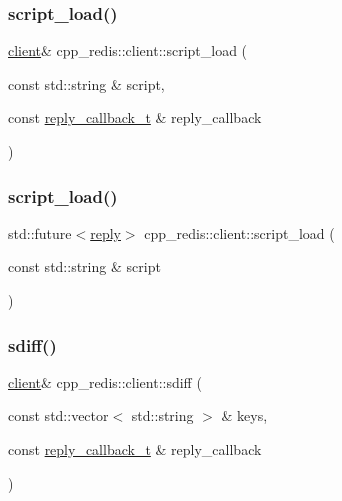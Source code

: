 \mbox{\label{classcpp__redis_1_1client_a1c1d1b3daff14dc29c32d1ea8407efdb}} 
\subsubsection{\texorpdfstring{script\+\_\+load()}{script\_load()}\hspace{0.1cm}{\footnotesize\ttfamily [1/2]}}
{\footnotesize\ttfamily \hyperlink{classcpp__redis_1_1client}{client}\& cpp\+\_\+redis\+::client\+::script\+\_\+load (\begin{DoxyParamCaption}\item[{const std\+::string \&}]{script,  }\item[{const \hyperlink{classcpp__redis_1_1client_a061a1140d36d2eaeda82b09a0bb3f9f2}{reply\+\_\+callback\+\_\+t} \&}]{reply\+\_\+callback }\end{DoxyParamCaption})}

\mbox{\label{classcpp__redis_1_1client_a2c42d83c0bfcb46d41d2c205d808e6c8}} 
\subsubsection{\texorpdfstring{script\+\_\+load()}{script\_load()}\hspace{0.1cm}{\footnotesize\ttfamily [2/2]}}
{\footnotesize\ttfamily std\+::future$<$\hyperlink{classcpp__redis_1_1reply}{reply}$>$ cpp\+\_\+redis\+::client\+::script\+\_\+load (\begin{DoxyParamCaption}\item[{const std\+::string \&}]{script }\end{DoxyParamCaption})}

\mbox{\label{classcpp__redis_1_1client_a9d70980e8fc5c90f218c5fd2215bed89}} 
\subsubsection{\texorpdfstring{sdiff()}{sdiff()}\hspace{0.1cm}{\footnotesize\ttfamily [1/2]}}
{\footnotesize\ttfamily \hyperlink{classcpp__redis_1_1client}{client}\& cpp\+\_\+redis\+::client\+::sdiff (\begin{DoxyParamCaption}\item[{const std\+::vector$<$ std\+::string $>$ \&}]{keys,  }\item[{const \hyperlink{classcpp__redis_1_1client_a061a1140d36d2eaeda82b09a0bb3f9f2}{reply\+\_\+callback\+\_\+t} \&}]{reply\+\_\+callback }\end{DoxyParamCaption})}

